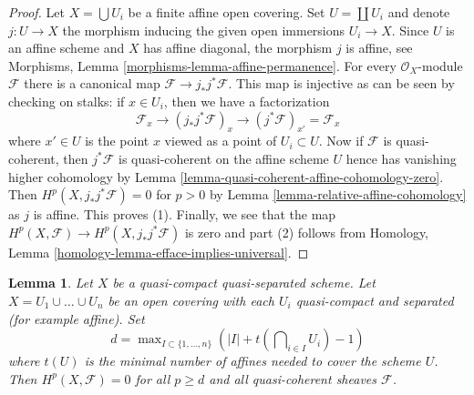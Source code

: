 \documentclass{stacks-project}
\theoremstyle{plain}
\newtheorem{lemma}[subsection]{Lemma}
\theoremstyle{definition}
\theoremstyle{remark}
\numberwithin{equation}{subsection}
\begin{document}
\begin{proof}
Let $X = \bigcup U_i$ be a finite affine open covering.
Set $U = \coprod U_i$ and denote $j : U \to X$
the morphism inducing the given open immersions $U_i \to X$.
Since $U$ is an affine scheme and $X$ has affine diagonal,
the morphism $j$ is affine, see
Morphisms, Lemma \ref{morphisms-lemma-affine-permanence}.
For every $\mathcal{O}_X$-module $\mathcal{F}$ there is
a canonical map $\mathcal{F} \to j_*j^*\mathcal{F}$.
This map is injective as can be seen by checking on stalks:
if $x \in U_i$, then we have a factorization
$$
\mathcal{F}_x \to (j_*j^*\mathcal{F})_x
\to (j^*\mathcal{F})_{x'} = \mathcal{F}_x
$$
where $x' \in U$ is the point $x$ viewed as a point of $U_i \subset U$.
Now if $\mathcal{F}$ is quasi-coherent, then $j^*\mathcal{F}$
is quasi-coherent on the affine scheme $U$ hence has vanishing
higher cohomology by
Lemma \ref{lemma-quasi-coherent-affine-cohomology-zero}.
Then $H^p(X, j_*j^*\mathcal{F}) = 0$ for
$p > 0$ by Lemma \ref{lemma-relative-affine-cohomology}
as $j$ is affine. This proves (1).
Finally, we see that the map
$H^p(X, \mathcal{F}) \to H^p(X, j_*j^*\mathcal{F})$
is zero and part (2) follows from
Homology, Lemma \ref{homology-lemma-efface-implies-universal}.
\end{proof}

\begin{lemma}
\label{lemma-vanishing-nr-affines-quasi-separated}
Let $X$ be a quasi-compact quasi-separated scheme.
Let $X = U_1 \cup \ldots \cup U_n$ be an open covering
with each $U_i$ quasi-compact and separated (for example affine).
Set
$$
d = \max\nolimits_{I \subset \{1, \ldots, n\}}
\left(|I| + t(\bigcap\nolimits_{i \in I} U_i) - 1\right)
$$
where $t(U)$ is the minimal number of affines needed to cover
the scheme $U$. Then $H^p(X, \mathcal{F}) = 0$ for all $p \geq d$ and all
quasi-coherent sheaves $\mathcal{F}$.
\end{lemma}
\end{document}
